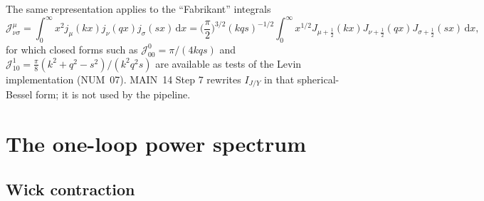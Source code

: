 \documentclass[11pt,a4paper]{article}
\newcommand{\dd}{\mathrm{d}}
\newcommand{\note}[1]{\textsf{#1}}
\theoremstyle{remark}
\begin{document}
The same representation applies to the ``Fabrikant'' integrals
\[
\mathcal{J}^{\mu}_{\nu\sigma} = \int_0^\infty x^2j_\mu(kx)j_\nu(qx)j_\sigma(sx)\,\dd x = \Big(\frac{\pi}{2}\Big)^{3/2}(kqs)^{-1/2}\int_0^\infty x^{1/2}J_{\mu+\frac12}(kx)J_{\nu+\frac12}(qx)J_{\sigma+\frac12}(sx)\,\dd x,
\]
for which closed forms such as $\mathcal{J}^0_{00} = \pi/(4kqs)$ and $\mathcal{J}^1_{10} = \tfrac{\pi}{8}(k^2+q^2-s^2)/(k^2q^2s)$ are available as tests of the Levin implementation (\note{NUM}~07). \note{MAIN}~14 Step 7 rewrites $I_{J/Y}$ in that spherical-Bessel form; it is not used by the pipeline.

\section{The one-loop power spectrum}
\label{sec:loop}

\subsection{Wick contraction}
\end{document}
